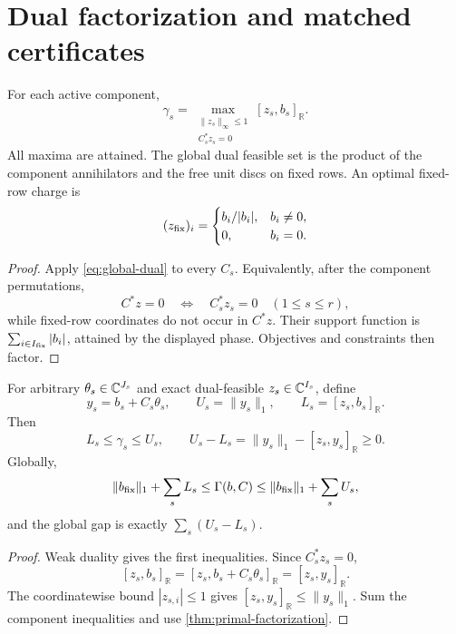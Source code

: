 \section{Dual factorization and matched certificates}
\label{sec:dual-certificates}

\begin{theorem}
\label{thm:dual-factorization}
For each active component,
\begin{equation}
 \boxed{
 \gamma_s
 =
 \max_{\substack{\|z_s\|_\infty\le1\\C_s^*z_s=0}}
 [z_s,b_s]_{\mathbb R}.}
 \label{eq:component-dual}
\end{equation}
All maxima are attained. The global dual feasible set is the product of
the component annihilators and the free unit discs on fixed rows. An
optimal fixed-row charge is
\[
 (z_{\rm fix})_i
 =
 \begin{cases}
 b_i/|b_i|,&b_i\ne0,\\
 0,&b_i=0.
 \end{cases}
\]
\end{theorem}

\begin{proof}
Apply \eqref{eq:global-dual} to every \(C_s\). Equivalently, after the
component permutations,
\[
 C^*z=0
 \quad\Longleftrightarrow\quad
 C_s^*z_s=0\quad(1\le s\le r),
\]
while fixed-row coordinates do not occur in \(C^*z\). Their support
function is \(\sum_{i\in I_{\rm fix}}|b_i|\), attained by the displayed
phase. Objectives and constraints then factor.
\end{proof}

\begin{theorem}
\label{thm:gap-certificate}
For arbitrary \(\theta_s\in\mathbb C^{J_s}\) and exact dual-feasible
\(z_s\in\mathbb C^{I_s}\), define
\[
 y_s=b_s+C_s\theta_s,\qquad
 U_s=\|y_s\|_1,\qquad
 L_s=[z_s,b_s]_{\mathbb R}.
\]
Then
\begin{equation}
 L_s\le\gamma_s\le U_s,
 \qquad
 U_s-L_s
 =
 \|y_s\|_1-[z_s,y_s]_{\mathbb R}\ge0.
 \label{eq:component-gap}
\end{equation}
Globally,
\begin{equation}
 \|b_{\rm fix}\|_1+\sum_sL_s
 \le
 \Gamma(b,C)
 \le
 \|b_{\rm fix}\|_1+\sum_sU_s,
 \label{eq:global-gap}
\end{equation}
and the global gap is exactly \(\sum_s(U_s-L_s)\).
\end{theorem}

\begin{proof}
Weak duality gives the first inequalities. Since \(C_s^*z_s=0\),
\[
 [z_s,b_s]_{\mathbb R}
 =
 [z_s,b_s+C_s\theta_s]_{\mathbb R}
 =
 [z_s,y_s]_{\mathbb R}.
\]
The coordinatewise bound \(|z_{s,i}|\le1\) gives
\([z_s,y_s]_{\mathbb R}\le\|y_s\|_1\). Sum the component inequalities
and use \cref{thm:primal-factorization}.
\end{proof}

